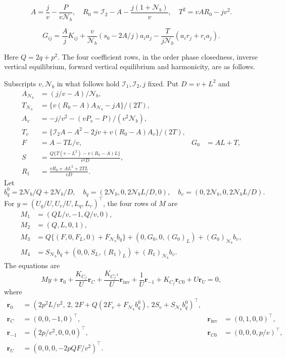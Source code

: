 \begin{equation}\label{supp:iso:trs-AT}
 A=\frac jv-\frac{P}{v\mathcal N_b},\quad
 R_0=\mathcal I_2-A-\frac{j(1+\mathcal N_b)}v,\quad
 T^2=vAR_0-jv^2.
\end{equation}

\begin{equation}\label{supp:appiso-G-reconstruct}
 G_{ij}=\frac AjK_{ij}+
       \frac v{\mathcal N_b}(s_0-2A/j)a_i a_j
       -\frac{T}{j\mathcal N_b}(a_i r_j+r_i a_j).
\end{equation}

Here $Q=2q+p^2$. The four coefficient rows, in the order phase
closedness, inverse vertical equilibrium, forward vertical
equilibrium and harmonicity, are as follows.

Subscripts $v,\mathcal N_b$
in what follows hold $\mathcal I_1,\mathcal I_2,j$ fixed.  Put $D=v+L^2$ and
\begin{align*}
 A_{\mathcal N_b}&=(j/v-A)/\mathcal N_b,\\
 T_{\mathcal N_b}&=\{v(R_0-A)A_{\mathcal N_b}-jA\}/(2T),\\
 A_v&=-j/v^2-(vP_v-P)/(v^2\mathcal N_b),\\
 T_v&=\{\mathcal I_2A-A^2-2jv+v(R_0-A)A_v\}/(2T),\\
 F&=A-TL/v,&G_0&=AL+T,\\
 S&=\frac{Q\{T(v-L^2)-v(R_0-A)L\}}{v^2D},\\
 R_1&=\frac{vR_0+AL^2+2TL}{vD}.
\end{align*}
Let
\[
 b_q^0=2\mathcal N_b/Q+2\mathcal N_b/D,\quad
 b_q=(2\mathcal N_b,0,2\mathcal N_b L/D,0),\quad b_\upsilon=(0,2\mathcal N_b,0,2\mathcal N_b L/D).
\]
For $y=(U_q/U,U_\upsilon/U,L_q,L_\upsilon)^{\top}$, the four rows of $M$ are
\begin{align*}
 M_1&=(QL/v,-1,Q/v,0),\\
 M_2&=(Q,L,0,1),\\
 M_3&=Q\{(F,0,F_L,0)+F_{\mathcal N_b}b_q\}
                  +(0,G_0,0,(G_0)_L)+(G_0)_{\mathcal N_b}b_\upsilon,\\
 M_4&=S_{\mathcal N_b}b_q+(0,0,S_L,(R_1)_L)+(R_1)_{\mathcal N_b}b_\upsilon.
\end{align*}
The equations are
\begin{equation}\label{supp:iso:trs-matrix}
 My+\boldsymbol r_0+\frac{K_{C_f}}{U}\boldsymbol r_C+\frac{K_{C_f^{-1}}}{U}\boldsymbol r_{\mathrm{inv}}
       +\frac1U \boldsymbol r_{-1}+K_{C_f}\boldsymbol r_{C0}+U\boldsymbol r_U=0,
\end{equation}
where
\begin{align*}
 \boldsymbol r_0&=(2p^2L/v^2,\,2,\,2F+Q(2F_v+F_{\mathcal N_b}b_q^0),\,
                           2S_v+S_{\mathcal N_b}b_q^0)^{\top},\\
 \boldsymbol r_C&=(0,0,-1,0)^{\top},&\boldsymbol r_{\mathrm{inv}}&=(0,1,0,0)^{\top},\\
 \boldsymbol r_{-1}&=(2p/v^2,0,0,0)^{\top},&\boldsymbol r_{C0}&=(0,0,0,p/v)^{\top},\\
 \boldsymbol r_U&=(0,0,0,-2pQF/v^2)^{\top}.
\end{align*}

